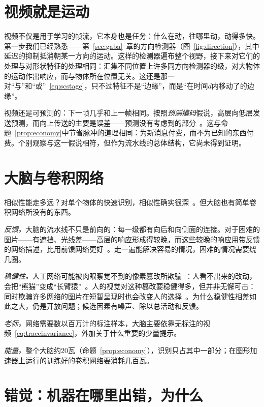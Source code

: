 \section{视频就是运动}

视频不仅是用于学习的帧流，它本身也是任务：什么在动，往哪里动，动得多快。第一步我们已经熟悉——第~\ref{sec:gaba}~章的方向检测器（图~\ref{fig:direction}），其中延迟的抑制抵消朝某一方向的运动。这样的检测器遍布整个视野，接下来对它们的处理与对形状特征的处理相同：汇集不同位置上许多同方向检测器的级，对大物体的运动作出响应，而与物体所在位置无关。这还是那一对“与”和“或”~\eqref{eq:scstage}，只不过特征不是“边缘”，而是“在时间$d$内移动了的边缘”。

视频还是可预测的：下一帧几乎和上一帧相同。按照\emph{预测编码}假说，高层向低层发送预测，而向上传送的主要是误差——预测没有考虑到的部分~\cite{RaoBallard1999}。这与命题~\ref{prop:economy}中节省脉冲的道理相同：为新消息付费，而不为已知的东西付费。个别观察与这一假说相符，但作为流水线的总体结构，它尚未得到证明。

\section{大脑与卷积网络}

相似性能走多远？对单个物体的快速识别，相似性确实很深~\cite{Yamins2014}。但大脑也有简单卷积网络所没有的东西。

\emph{反馈。}大脑的流水线不只是前向的：每一级都有向后和向侧面的连接。对于困难的图片——有遮挡、光线差——高层的响应形成得较晚，而这些较晚的响应用带反馈的网络描述，比用前馈网络更好~\cite{Kar2019}。走一遍能解决容易的情况，困难的情况需要绕几圈。

\emph{稳健性。}人工网络可能被肉眼察觉不到的像素篡改所欺骗~\cite{Szegedy2014}：人看不出来的改动，会把“熊猫”变成“长臂猿”~\cite{Goodfellow2015}。人的视觉对这种篡改要稳健得多，但并非无懈可击：同时欺骗许多网络的图片在短暂呈现时也会改变人的选择~\cite{Elsayed2018}。为什么稳健性相差如此之大，仍是开放问题；候选因素有噪声、除以总活动和反馈。

\emph{老师。}网络需要数以百万计的标注样本，大脑主要依靠无标注的视频~\eqref{eq:traceinvariance}，外加关于什么重要的少量提示。

\emph{能量。}整个大脑约$20$瓦（命题~\ref{prop:economy}），识别只占其中一部分；在图形加速器上运行的训练好的卷积网络要消耗几百瓦。

\section{错觉：机器在哪里出错，为什么}
\label{sec:illusions}

